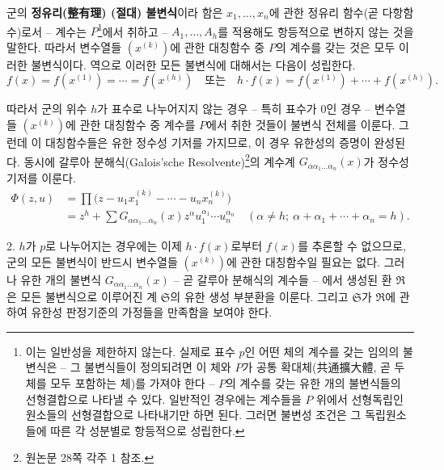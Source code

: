 군의 \textbf{정유리(整有理) (절대) 불변식}이라 함은 $x_1,\ldots,x_n$에 관한 정유리 함수(곧 다항함수)로서 -- 계수는 $P$\footnote{이는 일반성을 제한하지 않는다. 실제로 표수 $p$인 어떤 체의 계수를 갖는 임의의 불변식은 -- 그 불변식들이 정의되려면 이 체와 $P$가 공통 확대체(共通擴大體, 곧 두 체를 모두 포함하는 체)를 가져야 한다 -- $P$의 계수를 갖는 유한 개의 불변식들의 선형결합으로 나타낼 수 있다. 일반적인 경우에는 계수들을 $P$ 위에서 선형독립인 원소들의 선형결합으로 나타내기만 하면 된다. 그러면 불변성 조건은 그 독립원소들에 따른 각 성분별로 항등적으로 성립한다.}에서 취하고 -- $A_1,\ldots,A_h$를 적용해도 항등적으로 변하지 않는 것을 말한다. 따라서 변수열들 $(x^{(k)})$에 관한 대칭함수 중 $P$의 계수를 갖는 것은 모두 이러한 불변식이다. 역으로 이러한 모든 불변식에 대해서는 다음이 성립한다.
\[
 f(x)=f(x^{(1)})=\cdots=f(x^{(h)})
 \quad\text{또는}\quad
 h\cdot f(x)=f(x^{(1)})+\cdots+f(x^{(h)}).
\]

따라서 군의 위수 $h$가 표수로 나누어지지 않는 경우 -- 특히 표수가 $0$인 경우 -- 변수열들 $(x^{(k)})$에 관한 대칭함수 중 계수를 $P$에서 취한 것들이 불변식 전체를 이룬다. 그런데 이 대칭함수들은 유한 정수성 기저를 가지므로, 이 경우 유한성의 증명이 완성된다. 동시에 갈루아 분해식(Galois'sche Resolvente)\footnote{원논문 28쪽 각주 1 참조.}의 계수계 $G_{\alpha\alpha_1\ldots\alpha_n}(x)$가 정수성 기저를 이룬다.
\[
\begin{aligned}
\Phi(z,u)&=\prod\bigl(z-u_1x_1^{(k)}-\cdots-u_nx_n^{(k)}\bigr)\\
&=z^h+\sum G_{\alpha\alpha_1\ldots\alpha_n}(x)
 z^{\alpha}u_1^{\alpha_1}\cdots u_n^{\alpha_n}
 \quad(\alpha\ne h;\ \alpha+\alpha_1+\cdots+\alpha_n=h).
\end{aligned}
\]

2. $h$가 $p$로 나누어지는 경우에는 이제 $h\cdot f(x)$로부터 $f(x)$를 추론할 수 없으므로, 군의 모든 불변식이 반드시 변수열들 $(x^{(k)})$에 관한 대칭함수일 필요는 없다. 그러나 유한 개의 불변식 $G_{\alpha\alpha_1\ldots\alpha_n}(x)$ -- 곧 갈루아 분해식의 계수들 -- 에서 생성된 환 $\mathfrak R$은 모든 불변식으로 이루어진 계 $\mathfrak S$의 유한 생성 부분환을 이룬다. 그리고 $\mathfrak S$가 $\mathfrak R$에 관하여 유한성 판정기준의 가정들을 만족함을 보여야 한다.


